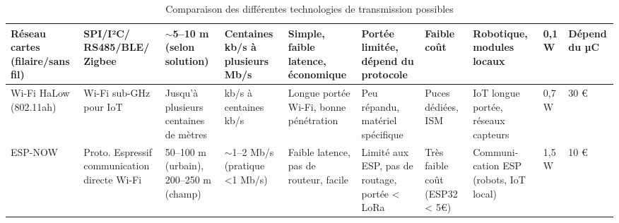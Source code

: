 \begin{table}
{{{\begin{tabular}{|P{2.5cm}|P{2.7cm}|P{2cm}|P{2cm}|P{2cm}|P{2.8cm}|P{2.4cm}|P{2cm}|P{1.5cm}|P{1.5cm}|}
                    \hline
                    Réseau cartes (filaire/sans fil) & SPI/I²C/ RS485/BLE/ Zigbee                   & $\sim$5–10 m (selon solution)         & Centaines kb/s à plusieurs Mb/s   & Simple, faible latence, économique     & Portée limitée, dépend du protocole           & Faible coût                   & Robotique, modules locaux               & 0,1 W            & Dépend du µC  \\
                    \hline
                    Wi-Fi HaLow (802.11ah)           & Wi-Fi sub-GHz pour IoT                       & Jusqu’à plusieurs centaines de mètres & kb/s à centaines kb/s             & Longue portée Wi-Fi, bonne pénétration & Peu répandu, matériel spécifique              & Puces dédiées, ISM            & IoT longue portée, réseaux capteurs     & 0,7 W            & 30 €          \\
                    \hline
                    ESP-NOW                          & Proto. Espressif communication directe Wi-Fi & 50–100 m (urbain), 200–250 m (champ)  & $\sim$1–2 Mb/s (pratique <1 Mb/s) & Faible latence, pas de routeur, facile & Limité aux ESP, pas de routage, portée < LoRa & Très faible coût (ESP32 < 5€) & Communi- cation ESP (robots, IoT local) & 1,5 W            & 10 €          \\
                    \hline
                \end{tabular}
            }%
        }%
        \caption{Comparaison des différentes technologies de transmission possibles}
    }%
\end{table}

